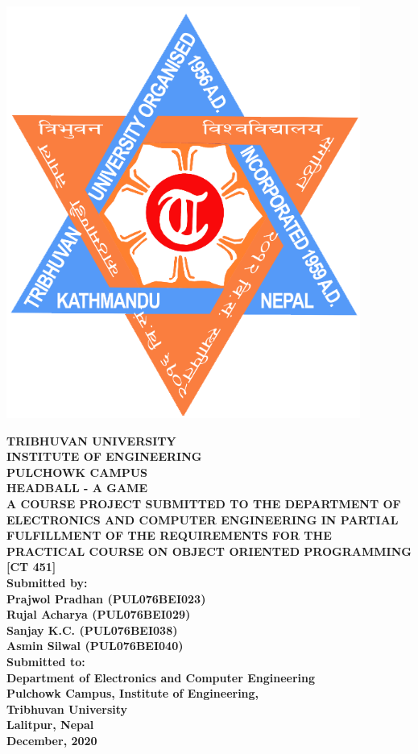 \documentclass[main.tex]{subfiles}
\begin{document}
\begin{titlepage}
	\begin{center}

	\includegraphics[scale=0.2]{graphics/tu_logo.png}

\textbf{	TRIBHUVAN UNIVERSITY\\
	INSTITUTE OF ENGINEERING\\
	PULCHOWK CAMPUS}\\
	[2cm]

\textbf{	HEADBALL - A GAME }\\
	[2cm]

\textbf{	A COURSE PROJECT SUBMITTED TO THE DEPARTMENT OF ELECTRONICS AND COMPUTER ENGINEERING IN PARTIAL FULFILLMENT OF THE REQUIREMENTS FOR THE PRACTICAL COURSE ON OBJECT ORIENTED PROGRAMMING [CT 451]}\\
	[2cm]

\textbf{	Submitted by:\\
	Prajwol Pradhan (PUL076BEI023)\\
	Rujal Acharya (PUL076BEI029)\\
	Sanjay K.C. (PUL076BEI038)\\
	Asmin Silwal (PUL076BEI040)}\\
	[1cm]

\textbf{Submitted to:\\
	Department of Electronics and Computer Engineering\\
	Pulchowk Campus, 	Institute of Engineering,\\ Tribhuvan University\\
	Lalitpur, Nepal}\\
	[1.5cm]

\textbf{	December, 2020}

	\end{center}
\end{titlepage} 
\end{document}

